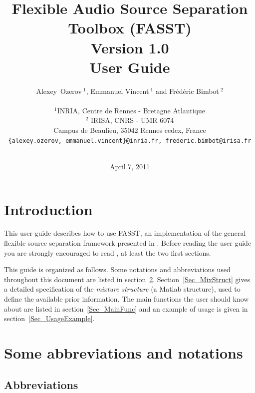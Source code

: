 \documentclass{article}
\begin{document}
\title{Flexible Audio Source Separation Toolbox (FASST) \\ Version 1.0 \\ User Guide}

\author{Alexey~Ozerov$~^1$, Emmanuel Vincent$~^1$ and Fr{\'e}d{\'e}ric Bimbot$~^2$ \\ \\
        $^1$INRIA, Centre de Rennes - Bretagne Atlantique \\
        $^2$ IRISA, CNRS - UMR 6074 \\
        Campus de Beaulieu, 35042 Rennes cedex, France\\
        {\tt\small \{alexey.ozerov, emmanuel.vincent\}@inria.fr, frederic.bimbot@irisa.fr} \\ \\}
\date{April 7, 2011}

\maketitle


\section{Introduction}

This user guide describes how to use FASST, an implementation of the general flexible source separation framework presented in \cite{Ozerov2010a}.
Before reading the user guide you are strongly encouraged to read \cite{Ozerov2010a}, at least the two first sections.

This guide is organized as follows. Some notations and abbreviations used throughout this document are listed in section~\ref{Sec_NotationsAbbrev}. Section~\ref{Sec_MixStruct} gives a detailed specification of the {\it mixture structure} (a Matlab structure), used to define the available prior information. The main functions the user should know about are listed in section~\ref{Sec_MainFunc} and an example of usage is given in section~\ref{Sec_UsageExample}.



\section{Some abbreviations and notations}
\label{Sec_NotationsAbbrev}


\subsection{Abbreviations}
\end{document}

